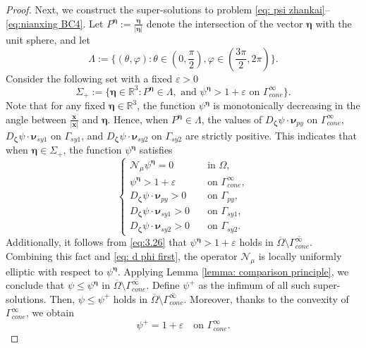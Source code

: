 \documentclass[reqno,12pt]{amsart}
\numberwithin{equation}{section}
\begin{document}
\begin{proof}
    Next, we construct the super-solutions to problem \eqref{eq: psi zhankai}--\eqref{eq:nianxing BC4}. Let $P^{\bm{\eta}}:=\frac{\bm{\eta}}{|\bm{\eta}|}$ denote the intersection of the vector $\bm{\eta}$ with the unit sphere, and let
    \begin{equation*}
         \Lambda:=\{(\theta,\varphi):\theta\in(0,\frac{\pi}{2}),\varphi\in(\frac{3\pi}{2},2\pi)\}.
    \end{equation*}
    Consider the following set with a fixed $\varepsilon>0$
	\begin{equation}\label{eq:4.8}
		\Sigma_{+}:=\{\bm{\eta}\in\mathbb{R}^{3}: P^{\bm{\eta}}\in \Lambda, \text{ and }{\psi}^{\bm{\eta}}>1+\varepsilon\text{ on }\Gamma_{cone}^{\infty}\}.
	\end{equation}
    Note that for any fixed $\bm{\eta}\in \mathbb{R}^{3}$, the function ${\psi}^{\bm{\eta}}$ is monotonically decreasing in the angle between $\frac{\bm{x}}{|\bm{x}|}$ and $\bm{\eta}$. Hence, when $P^{\bm{\eta}}\in \Lambda$, the values of $D_{\bm{\zeta}}\psi\cdot\bm{\nu}_{py}$ on $\Gamma^{\infty}_{cone}$, $D_{\bm{\zeta}}\psi\cdot\bm{\nu}_{sy1}$ on $\Gamma_{sy1}$, and $D_{\bm{\zeta}}\psi\cdot\bm{\nu}_{sy2}$ on $\Gamma_{sy2}$ are strictly positive. This indicates that
   when $\bm{\eta}\in \Sigma_{+}$, the function ${\psi}^{\bm{\eta}}$ satisfies
	\begin{equation*}
		\begin{cases}
			\mathcal{N}_\mu {\psi}^{\bm{\eta}}= 0\quad&\text{in $\Omega$},\\
			{\psi}^{\bm{\eta}}>1+\varepsilon\quad&\text{on $\Gamma_{cone}^{\infty}$},\\
            D_{\bm{\zeta}}\psi\cdot\bm{\nu}_{py}>0\quad&\text{on $\Gamma_{py}$},\\
			D_{\bm{\zeta}}\psi\cdot\bm{\nu}_{sy1}>0\quad&\text{on $\Gamma_{sy1}$},\\
                D_{\bm{\zeta}}\psi\cdot\bm{\nu}_{sy2}>0\quad&\text{on $\Gamma_{sy2}$}.
		\end{cases}
	\end{equation*}
   Additionally, it follows from \eqref{eq:3.26} that ${\psi}^{\bm{\eta}}>1+\varepsilon$ holds in $\overline{\Omega}\setminus\overline{\Gamma_{cone}^{\infty}}$. Combining this fact and \eqref{eq: d phi first}, the operator $\mathcal{N}_\mu $ is locally uniformly elliptic with respect to ${\psi}^{\bm{\eta}}$. Applying Lemma \ref{lemma: comparison principle}, we conclude that $\psi\leq {\psi}^{\bm{\eta}}$ in $\overline{\Omega}\setminus\overline{\Gamma_{cone}^{\infty}}$. Define $\psi^+$ as the infimum of all such super-solutions. Then, $\psi\leq \psi^+$ holds in $\overline{\Omega}\setminus\overline{\Gamma_{cone}^{\infty}}$. Moreover, thanks to the convexity of $\Gamma_{cone}^{\infty}$, we obtain
	\begin{equation*}
		\psi^+=1+\varepsilon\quad\text{on $\Gamma_{cone}^{\infty}$}.
	\end{equation*}
  

\end{proof}
\end{document}
